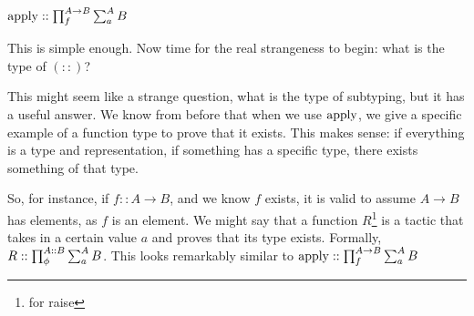 \begin{math}
	\apl :: \fdt{A \to B}{f} \pdt{A}{a} B
\end{math}

This is simple enough.
Now time for the real strangeness to begin: what is the type of $(::)$?

This might seem like a strange question, what is the type of subtyping, but it has a useful answer.
We know from before that when we use $\apl$, we give a specific example of a function type to prove that it exists.
This makes sense: if everything is a type and representation, if something has a specific type, there exists something of that type.

So, for instance, if $f :: A \to B$, and we know $f$ exists, it is valid to assume $A \to B$ has elements, as $f$ is an element.
We might say that a function $R$\footnote{for raise} is a tactic that takes in a certain value $a$ and proves that its type exists.
Formally, $R :: \fdt{A :: B}{\phi} \pdt{A}{a} B$.
This looks remarkably similar to $\apl :: \fdt{A \to B}{f} \pdt{A}{a} B$
